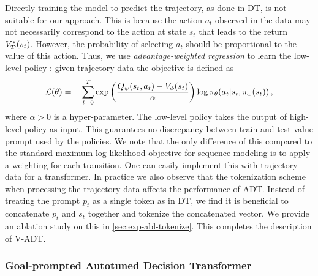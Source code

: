 Directly training the model to predict the trajectory, as done in DT, is not suitable for our approach. This is because the action $a_t$ observed in the data may not necessarily correspond to the action at state $s_t$ that leads  to the return $V^*_{{\mathcal{D}}}(s_t)$. 
However, the probability of selecting $a_t$ should be proportional to the value of this action. 
Thus,  we use \emph{advantage-weighted regression} to learn the low-level policy \citep{peng2019advantage,kostrikov2022offline,xiaosample}: given trajectory data  the objective is defined as
\begin{align}
{\mathcal{L}}(\theta) = -\sum_{t=0}^T \exp\left( \frac{Q_\psi(s_t,a_t) - V_{\phi}(s_t)}{\alpha}  \right) \log \pi_{\theta} (a_t | s_t, \pi_\omega(s_t))\, ,
\label{eq:low-level-pi}
\end{align}
where $\alpha>0$ is a hyper-parameter.  
The low-level policy takes the output of high-level policy as input. This guarantees no discrepancy between train and test value prompt used by the policies.  
We note that the only difference of this compared to the standard maximum log-likelihood objective for sequence modeling is to apply a weighting for each transition.  
One can easily implement this with trajectory data for a transformer. 
In practice we also observe that the tokenization scheme when processing the trajectory data affects the performance of ADT.  
Instead of treating the prompt $p_t$ as a single token as in DT, we find it is beneficial to concatenate $p_t$ and $s_t$ together and tokenize the concatenated vector. 
We provide an ablation study on this in \cref{sec:exp-abl-tokenize}.  
This completes the description of V-ADT. 

\subsubsection{Goal-prompted Autotuned Decision Transformer}

\iffalse
In HRL, the high-level policy considers latent action space, typical choices of which includes \emph{sub-goal} \citep{andrychowicz2017hindsight,nachum2018data,park2023hiql}, \emph{skills} \citep{co2018self,ajay2020opal,lynch2020learning,jiang2022efficient,chebotar2021actionable}, 
and options \citep{sutton1999between,bacon2017option,wulfmeier2021data}
\fi

